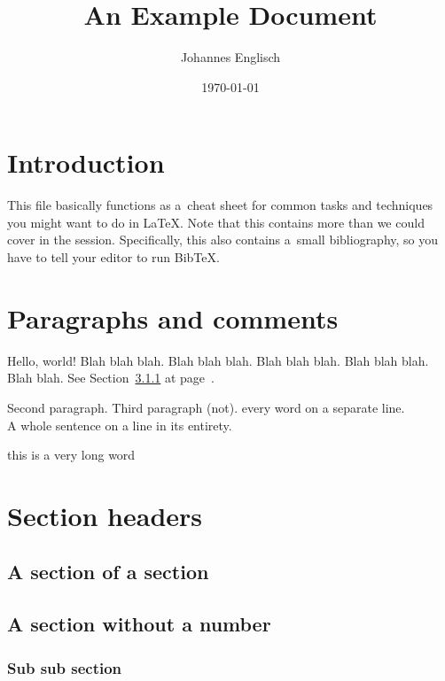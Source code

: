 \documentclass{scrartcl}
\author{Johannes Englisch}
\title{An Example Document}
\date{\today}
\begin{document}
\maketitle

\tableofcontents

\section{Introduction}

This file basically functions as a~cheat sheet for common tasks and techniques
you might want to do in \LaTeX.
Note that this contains more than we could cover in the session.
Specifically, this also contains a~small bibliography, so you have to tell your
editor to run Bib\TeX{}.

\section{Paragraphs and comments}

Hello, world!
Blah blah blah.
Blah blah blah.
Blah blah blah.
Blah blah blah.
Blah blah.
See Section~\ref{sec:thesubsection} at page~\pageref{sec:thesubsection}.

Second paragraph.
Third paragraph (not).
every
word
on
a
separate
line. \\
A whole sentence on a line in its entirety.

this%
is%
a%
    very%
  long%
word

\section{Section headers}

\subsection{A section of a section}

\subsection*{A section without a number}

\subsubsection{Sub sub section}%
\label{sec:thesubsection}
\end{document}
